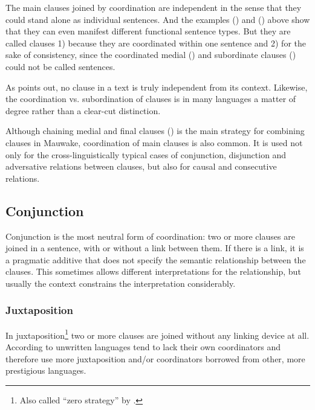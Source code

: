 The main clauses joined by coordination are independent in the sense that they could stand alone as individual sentences. And the examples () and () above show that they can even manifest different functional sentence types. But they are called clauses 1) because they are coordinated within one sentence and 2) for the sake of consistency, since the coordinated medial () and subordinate clauses () could not be called sentences.

As \citet[848]{Givon1990} points out, no clause in a text is truly independent from its context. Likewise, the coordination vs. subordination of clauses is in many languages a matter of degree rather than a clear-cut distinction. 

Although chaining medial and final clauses () is the main strategy for combining clauses in Mauwake, coordination of main clauses is also common. It is used not only for the cross-linguistically typical cases of conjunction, disjunction and adversative relations between clauses, but also for causal and consecutive relations.  

\subsection{Conjunction}

Conjunction is the most neutral form of coordination: two or more clauses are joined in a sentence, with or without a link between them. If there is a link, it is a pragmatic additive that does not specify the semantic relationship between the clauses. This sometimes allows different interpretations for the relationship, but usually the context constrains the interpretation considerably. 

\subsubsection[Juxtaposition]{Juxtaposition}

In juxtaposition\footnote{Also called ``zero strategy'' by \citet[25]{Payne1985}.} two or more clauses are joined without any linking device at all. According to \citet[8]{Haspelmath2007} unwritten languages tend to lack their own coordinators and therefore use more juxtaposition and/or coordinators borrowed  from other, more prestigious languages. 

